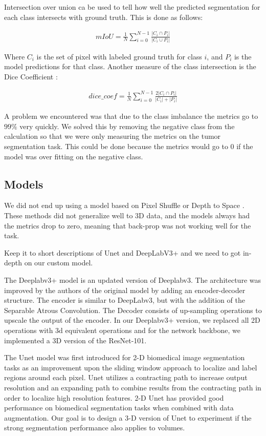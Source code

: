 \documentclass[10pt,twocolumn,letterpaper]{article}
\begin{document}
Intersection over union \cite{MET}  ca be used to tell how well  the predicted segmentation for each class intersects with ground truth. This is done as follows:

\begin{align}
mIoU = \frac{1}{N} \sum_{i=0}^{N-1} \frac{| C_i \cap P_i|}{|C_i \cup P_i|} 
\end{align}

Where $C_i$ is the set of pixel with labeled ground truth for class $i$, and $P_i$ is the model predictions for that class. Another measure of the class intersection is the Dice Coefficient \cite{MET} :

\begin{align}
dice\_coef = \frac{1}{N} \sum_{i=0}^{N-1} \frac{2| C_i \cap P_i|}{|C_i |+ | P_i|}
\end{align}

A problem we encountered was that due to the class imbalance the metrics go to $99 \%$ very quickly. We solved this by removing the negative class from the calculation so that we were only measuring  the metrics on the tumor segmentation task. This could be done because the metrics would go to 0 if the model was over fitting on the negative class.


\subsection{Models}

We did not end up using a model based on Pixel Shuffle \cite{PIX} or Depth to Space \cite{DEP}. These methods did not generalize well to 3D data, and the models always had the metrics drop to zero, meaning that back-prop was not working well for the task.


Keep it to short descriptions of Unet and DeepLabV3+ and we need to got in-depth on our custom model. 

The Deeplabv3+ model is an updated version of Deeplabv3. The architecture was improved by the authors of the original model by adding an encoder-decoder structure. The encoder is similar to DeepLabv3, but with the addition of the Separable Atrous Convolution. The Decoder consists of up-sampling operations to upscale the output of the encoder. In our Deeplabv3+ version, we replaced all 2D operations with 3d equivalent operations and for the network backbone, we implemented a 3D version of the ResNet-101.
 
The Unet model was first introduced for 2-D biomedical image segmentation tasks as an improvement upon the sliding window approach to localize and label regions around each pixel. Unet utilizes a contracting path to increase output resolution and an expanding path to combine results from the contracting path in order to localize high resolution features. 2-D Unet has provided good performance on biomedical segmentation tasks when combined with data augmentation. Our goal is to design a 3-D version of Unet to experiment if the strong segmentation performance also applies to volumes.
\end{document}
